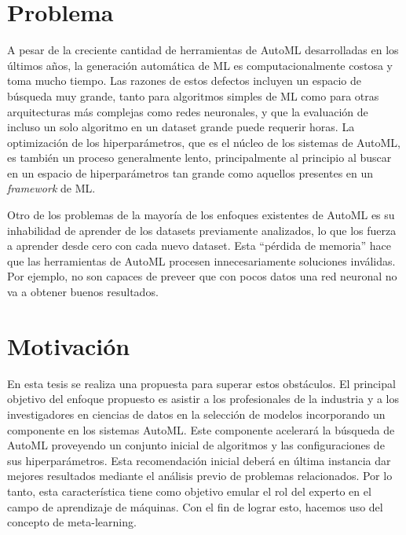 \section*{Problema}

A pesar de la creciente cantidad de herramientas de AutoML desarrolladas en los últimos años, la generación automática de ML es computacionalmente costosa y toma mucho tiempo. Las razones de estos defectos incluyen un espacio de búsqueda muy grande, tanto para algoritmos simples de ML como para otras arquitecturas más complejas como redes neuronales, y que la evaluación de incluso un solo algoritmo en un dataset grande puede requerir horas. La optimización de los hiperparámetros, que es el núcleo de los sistemas de AutoML, es también un proceso generalmente lento, principalmente al principio al buscar en un espacio de hiperparámetros tan grande como aquellos presentes en un \textit{framework} de ML.

Otro de los problemas de la mayoría de los enfoques existentes de AutoML es su inhabilidad de aprender de los datasets previamente analizados, lo que los fuerza a aprender desde cero con cada nuevo dataset. Esta ``pérdida de memoria'' hace que las herramientas de AutoML procesen innecesariamente soluciones inválidas. Por ejemplo, no son capaces de preveer que con pocos datos una red neuronal no va a obtener buenos resultados. 



\section*{Motivación}

En esta tesis se realiza una propuesta para superar estos obstáculos. El principal objetivo del enfoque propuesto es asistir a los profesionales de la industria y a los investigadores en ciencias de datos en la selección de modelos incorporando un componente en los sistemas AutoML. Este componente acelerará la búsqueda de AutoML proveyendo un conjunto inicial de algoritmos y las configuraciones de sus hiperparámetros. Esta recomendación inicial deberá en última instancia dar mejores resultados mediante el análisis previo de problemas relacionados. Por lo tanto, esta característica tiene como objetivo emular el rol del experto en el campo de aprendizaje de máquinas. Con el fin de lograr esto, hacemos uso del concepto de meta-learning. 


